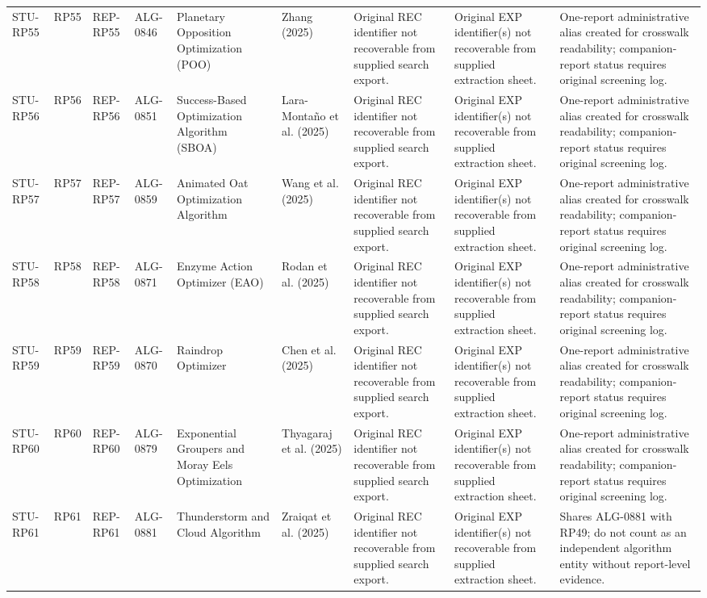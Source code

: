 \documentclass[9pt]{article}
\begin{document}
\begin{landscape}
\begin{longtable}{P{1.5cm}P{1.0cm}P{1.8cm}P{1.8cm}P{5.2cm}P{4.3cm}P{3.4cm}P{3.3cm}P{3.0cm}}
STU-RP55 & RP55 & REP-RP55 & ALG-0846 & Planetary Opposition Optimization (POO) & Zhang (2025) & Original REC identifier not recoverable from supplied search export. & Original EXP identifier(s) not recoverable from supplied extraction sheet. & One-report administrative alias created for crosswalk readability; companion-report status requires original screening log. \\
STU-RP56 & RP56 & REP-RP56 & ALG-0851 & Success-Based Optimization Algorithm (SBOA) & Lara-Montaño et al. (2025) & Original REC identifier not recoverable from supplied search export. & Original EXP identifier(s) not recoverable from supplied extraction sheet. & One-report administrative alias created for crosswalk readability; companion-report status requires original screening log. \\
STU-RP57 & RP57 & REP-RP57 & ALG-0859 & Animated Oat Optimization Algorithm & Wang et al. (2025) & Original REC identifier not recoverable from supplied search export. & Original EXP identifier(s) not recoverable from supplied extraction sheet. & One-report administrative alias created for crosswalk readability; companion-report status requires original screening log. \\
STU-RP58 & RP58 & REP-RP58 & ALG-0871 & Enzyme Action Optimizer (EAO) & Rodan et al. (2025) & Original REC identifier not recoverable from supplied search export. & Original EXP identifier(s) not recoverable from supplied extraction sheet. & One-report administrative alias created for crosswalk readability; companion-report status requires original screening log. \\
STU-RP59 & RP59 & REP-RP59 & ALG-0870 & Raindrop Optimizer & Chen et al. (2025) & Original REC identifier not recoverable from supplied search export. & Original EXP identifier(s) not recoverable from supplied extraction sheet. & One-report administrative alias created for crosswalk readability; companion-report status requires original screening log. \\
STU-RP60 & RP60 & REP-RP60 & ALG-0879 & Exponential Groupers and Moray Eels Optimization & Thyagaraj et al. (2025) & Original REC identifier not recoverable from supplied search export. & Original EXP identifier(s) not recoverable from supplied extraction sheet. & One-report administrative alias created for crosswalk readability; companion-report status requires original screening log. \\
STU-RP61 & RP61 & REP-RP61 & ALG-0881 & Thunderstorm and Cloud Algorithm & Zraiqat et al. (2025) & Original REC identifier not recoverable from supplied search export. & Original EXP identifier(s) not recoverable from supplied extraction sheet. & Shares ALG-0881 with RP49; do not count as an independent algorithm entity without report-level evidence. \\

\end{longtable}
\end{landscape}
\end{document}
